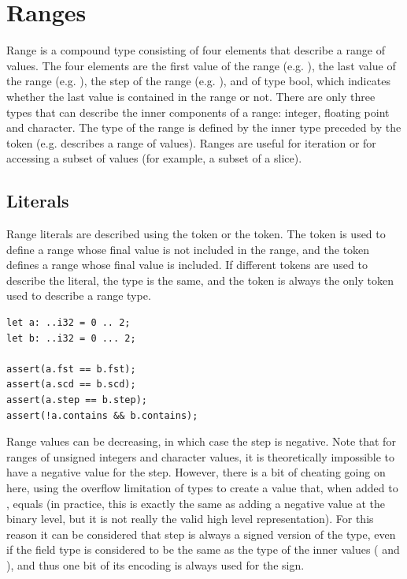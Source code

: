 \section {Ranges}%
\label{sec:range_type}

Range is a compound type consisting of four elements that describe a range of
values. The four elements are  the first value of the range (e.g.
),  the last value of the range (e.g. ),
 the step of the range (e.g. ), and  of
type bool, which indicates whether the last value  is contained in
the range or not. There are only three types that can describe the inner
components of a range: integer, floating point and character. The type of the
range is defined by the inner type preceded by the token  (e.g.
 describes a range of  values). Ranges are useful for
iteration or for accessing a subset of values (for example, a subset of a
slice).

\subsection {Literals}

Range literals are described using the  token or the 
token. The  token is used to define a range whose final value is not
included in the range, and the  token defines a range whose final
value is included. If different tokens are used to describe the literal, the
type is the same, and the  token is always the only token used to
describe a range type.

\begin{lstlisting}[style=coloredverbatim]
let a: ..i32 = 0 .. 2;
let b: ..i32 = 0 ... 2;

assert(a.fst == b.fst);
assert(a.scd == b.scd);
assert(a.step == b.step);
assert(!a.contains && b.contains);
\end{lstlisting}

Range values can be decreasing, in which case the step is negative. Note that
for ranges of unsigned integers and character values, it is theoretically
impossible to have a negative value for the step. However, there is a bit of
cheating going on here, using the overflow limitation of types to create a value
that, when added to , equals  (in practice,
this is exactly the same as adding a negative value at the binary level, but it
is not really the valid high level representation). For this reason it can be
considered that step is always a signed version of the type, even if the field
type is considered to be the same as the type of the inner values (
and ), and thus one bit of its encoding is always used for the sign.
\smallskip

